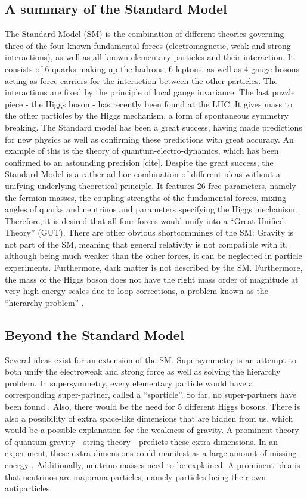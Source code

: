 \documentclass[twoside,        %
               BCOR12mm,       %
               ngerman,english, %
               fleqn,headsepline=false,footsepline=false
              ]{Vorlage/MFPREPORT}
\begin{document}
\subsection{A summary of the Standard Model}
The Standard Model (SM) is the combination of different theories governing
three of the four known fundamental forces (electromagnetic, weak and strong
interactions), as well as all known elementary particles and their interaction. 
It consists of 6 quarks making up the hadrons, 6 leptons, as well as 4 gauge
bosons acting as force carriers for the interaction between the other
particles. The interactions are fixed by the principle of local gauge
invariance. The last puzzle piece - the Higgs boson - has recently been found at
the LHC. It gives mass to the other particles by the Higgs mechanism, a form of
spontaneous symmetry breaking. 
The Standard model has been a great success, having made predictions for new
physics as well as confirming these predictions with great accuracy. An example
of this is the theory of quantum-electro-dynamics, which has been confirmed to
an astounding precision [cite].
Despite the great success, the Standard Model is a rather ad-hoc combination of
different ideas without a unifying underlying theoretical principle. It
features 26 free parameters, namely the fermion masses, the coupling strengths
of the fundamental forces, mixing angles of quarks and neutrinos and parameters
specifying the Higgs mechanism \cite[p.]{thomson}. Therefore, it is
desired that all four forces would unify into a ``Great Unified Theory'' (GUT).
There are other obvious shortcommings of the SM: Gravity is not
part of the SM, meaning that general relativity is not compatible with it,
although being much weaker than the other forces, it can be neglected in
particle experiments.
Furthermore, dark matter is not described by the SM. Furthermore, the
mass of the Higgs boson does not have the right mass order of magnitude at very
high energy scales due to loop corrections, a problem known as the ``hierarchy
problem'' \cite[p.]{thomson}.

\subsection{Beyond the Standard Model}
Several ideas exist for an extension of the SM. Supersymmetry is an attempt to
both unify the electroweak and strong force as well as solving the hierarchy
problem. In supersymmetry, every elementary particle would have a corresponding
super-partner, called a ``sparticle''. So far, no super-partners have been
found \cite{thomson}. Also, there would be the need for 5 different Higgs
bosons. There is also a possibility of extra space-like dimensions that are
hidden from us, which would be a possible explanation for the weakness of
gravity. A prominent theory of quantum gravity - string theory - predicts these
extra dimensions. In an experiment, these extra dimensions could manifest as a
large amount of missing energy \cite{zwiebach2004first}. 
Additionally, neutrino masses need to be explained. A prominent idea is that
neutrinos are majorana particles, namely particles being their own
antiparticles.
\end{document}
